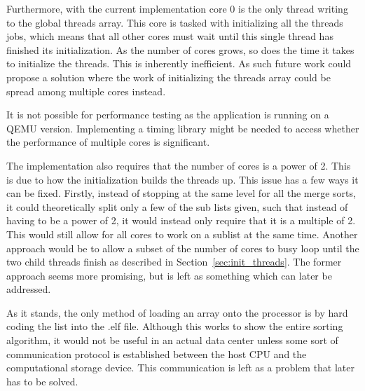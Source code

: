 Furthermore, with the current implementation core 0 is the only thread writing
to the global threads array. This core is tasked with initializing all the
threads jobs, which means that all other cores must wait until this single
thread has finished its initialization. As the number of cores grows, so does
the time it takes to initialize the threads. This is inherently inefficient. As
such future work could propose a solution where the work of initializing the
threads array could be spread among multiple cores instead.

It is not possible for performance testing as the application is running on a
QEMU version. Implementing a timing library might be needed to access whether
the performance of multiple cores is significant.

The implementation also requires that the number of cores is a power of 2. This
is due to how the initialization builds the threads up. This issue has a few
ways it can be fixed. Firstly, instead of stopping at the same level for all the
merge sorts, it could theoretically split only a few of the sub lists given,
such that instead of having to be a power of 2, it would instead only require
that it is a multiple of 2. This would still allow for all cores to work on a
sublist at the same time. Another approach would be to allow a subset of the
number of cores to busy loop until the two child threads finish as described in
Section~\ref{sec:init_threads}. The former approach seems more promising, but is
left as something which can later be addressed.

As it stands, the only method of loading an array onto the processor is by hard
coding the list into the .elf file. Although this works to show the entire
sorting algorithm, it would not be useful in an actual data center unless some
sort of communication protocol is established between the host CPU and the
computational storage device. This communication is left as a problem that later
has to be solved.


